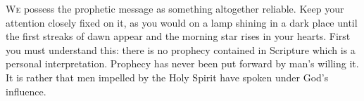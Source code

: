
\lettrine{W}{e} possess the prophetic message as something altogether reliable. Keep your attention closely fixed on it, as you would on a lamp shining in a dark place until the first streaks of dawn appear and the morning star rises in your hearts. First you must understand this: there is no prophecy contained in Scripture which is a personal interpretation. Prophecy has never been put forward by man’s willing it. It is rather that men impelled by the Holy Spirit have spoken under God’s influence.